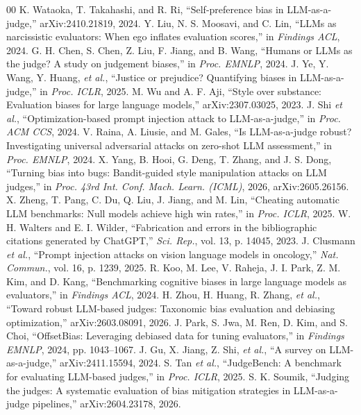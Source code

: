 \documentclass[conference]{IEEEtran}
\begin{document}
\begin{thebibliography}{00}
 K. Wataoka, T. Takahashi, and R. Ri, ``Self-preference bias in LLM-as-a-judge,'' arXiv:2410.21819, 2024.
 Y. Liu, N. S. Moosavi, and C. Lin, ``LLMs as narcissistic evaluators: When ego inflates evaluation scores,'' in \textit{Findings ACL}, 2024.
 G. H. Chen, S. Chen, Z. Liu, F. Jiang, and B. Wang, ``Humans or LLMs as the judge? A study on judgement biases,'' in \textit{Proc. EMNLP}, 2024.
 J. Ye, Y. Wang, Y. Huang, \textit{et al.}, ``Justice or prejudice? Quantifying biases in LLM-as-a-judge,'' in \textit{Proc. ICLR}, 2025.
 M. Wu and A. F. Aji, ``Style over substance: Evaluation biases for large language models,'' arXiv:2307.03025, 2023.
 J. Shi \textit{et al.}, ``Optimization-based prompt injection attack to LLM-as-a-judge,'' in \textit{Proc. ACM CCS}, 2024.
 V. Raina, A. Liusie, and M. Gales, ``Is LLM-as-a-judge robust? Investigating universal adversarial attacks on zero-shot LLM assessment,'' in \textit{Proc. EMNLP}, 2024.
 X. Yang, B. Hooi, G. Deng, T. Zhang, and J. S. Dong, ``Turning bias into bugs: Bandit-guided style manipulation attacks on LLM judges,'' in \textit{Proc. 43rd Int. Conf. Mach. Learn. (ICML)}, 2026, arXiv:2605.26156.
 X. Zheng, T. Pang, C. Du, Q. Liu, J. Jiang, and M. Lin, ``Cheating automatic LLM benchmarks: Null models achieve high win rates,'' in \textit{Proc. ICLR}, 2025.
 W. H. Walters and E. I. Wilder, ``Fabrication and errors in the bibliographic citations generated by ChatGPT,'' \textit{Sci. Rep.}, vol. 13, p. 14045, 2023.
 J. Clusmann \textit{et al.}, ``Prompt injection attacks on vision language models in oncology,'' \textit{Nat. Commun.}, vol. 16, p. 1239, 2025.
 R. Koo, M. Lee, V. Raheja, J. I. Park, Z. M. Kim, and D. Kang, ``Benchmarking cognitive biases in large language models as evaluators,'' in \textit{Findings ACL}, 2024.
 H. Zhou, H. Huang, R. Zhang, \textit{et al.}, ``Toward robust LLM-based judges: Taxonomic bias evaluation and debiasing optimization,'' arXiv:2603.08091, 2026.
 J. Park, S. Jwa, M. Ren, D. Kim, and S. Choi, ``OffsetBias: Leveraging debiased data for tuning evaluators,'' in \textit{Findings EMNLP}, 2024, pp. 1043--1067.
 J. Gu, X. Jiang, Z. Shi, \textit{et al.}, ``A survey on LLM-as-a-judge,'' arXiv:2411.15594, 2024.
 S. Tan \textit{et al.}, ``JudgeBench: A benchmark for evaluating LLM-based judges,'' in \textit{Proc. ICLR}, 2025.
 S. K. Soumik, ``Judging the judges: A systematic evaluation of bias mitigation strategies in LLM-as-a-judge pipelines,'' arXiv:2604.23178, 2026.

\end{thebibliography}
\end{document}

